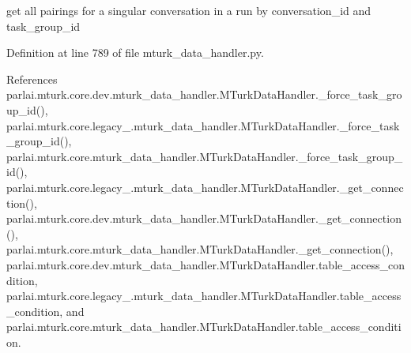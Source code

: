 \begin{DoxyVerb}get all pairings for a singular conversation in a run by
conversation_id and task_group_id
\end{DoxyVerb}
 

Definition at line 789 of file mturk\+\_\+data\+\_\+handler.\+py.



References parlai.\+mturk.\+core.\+dev.\+mturk\+\_\+data\+\_\+handler.\+M\+Turk\+Data\+Handler.\+\_\+force\+\_\+task\+\_\+group\+\_\+id(), parlai.\+mturk.\+core.\+legacy\+\_.\+mturk\+\_\+data\+\_\+handler.\+M\+Turk\+Data\+Handler.\+\_\+force\+\_\+task\+\_\+group\+\_\+id(), parlai.\+mturk.\+core.\+mturk\+\_\+data\+\_\+handler.\+M\+Turk\+Data\+Handler.\+\_\+force\+\_\+task\+\_\+group\+\_\+id(), parlai.\+mturk.\+core.\+legacy\+\_.\+mturk\+\_\+data\+\_\+handler.\+M\+Turk\+Data\+Handler.\+\_\+get\+\_\+connection(), parlai.\+mturk.\+core.\+dev.\+mturk\+\_\+data\+\_\+handler.\+M\+Turk\+Data\+Handler.\+\_\+get\+\_\+connection(), parlai.\+mturk.\+core.\+mturk\+\_\+data\+\_\+handler.\+M\+Turk\+Data\+Handler.\+\_\+get\+\_\+connection(), parlai.\+mturk.\+core.\+dev.\+mturk\+\_\+data\+\_\+handler.\+M\+Turk\+Data\+Handler.\+table\+\_\+access\+\_\+condition, parlai.\+mturk.\+core.\+legacy\+\_.\+mturk\+\_\+data\+\_\+handler.\+M\+Turk\+Data\+Handler.\+table\+\_\+access\+\_\+condition, and parlai.\+mturk.\+core.\+mturk\+\_\+data\+\_\+handler.\+M\+Turk\+Data\+Handler.\+table\+\_\+access\+\_\+condition.

